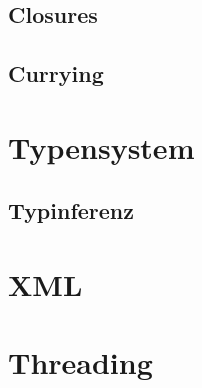 \subsection{Closures}

\subsection{Currying}

\section{Typensystem}

\subsection{Typinferenz}

\section{XML}

\section{Threading}
